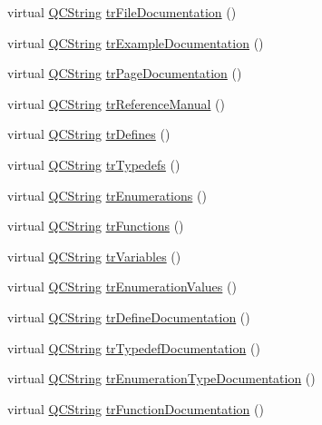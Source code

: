 \begin{DoxyCompactItemize}
virtual \hyperlink{class_q_c_string}{Q\-C\-String} \hyperlink{class_translator_slovak_a5208d68e101288c987a9c3460f4708f8}{tr\-File\-Documentation} ()
\item 
virtual \hyperlink{class_q_c_string}{Q\-C\-String} \hyperlink{class_translator_slovak_a21a3f1a3c620fec9b4f7f8ecc21fff8e}{tr\-Example\-Documentation} ()
\item 
virtual \hyperlink{class_q_c_string}{Q\-C\-String} \hyperlink{class_translator_slovak_a7cf8ab505f757f138ca06e41097d7e8d}{tr\-Page\-Documentation} ()
\item 
virtual \hyperlink{class_q_c_string}{Q\-C\-String} \hyperlink{class_translator_slovak_a2c056f492d9d9bfc42e365c9a72f690f}{tr\-Reference\-Manual} ()
\item 
virtual \hyperlink{class_q_c_string}{Q\-C\-String} \hyperlink{class_translator_slovak_aa64bcd419328b32bfc89195cf544cbbc}{tr\-Defines} ()
\item 
virtual \hyperlink{class_q_c_string}{Q\-C\-String} \hyperlink{class_translator_slovak_ac46d406eb9bb5b176aae39b6c502d8ed}{tr\-Typedefs} ()
\item 
virtual \hyperlink{class_q_c_string}{Q\-C\-String} \hyperlink{class_translator_slovak_a4ee6ca6fa76e56b5404130aaaf698085}{tr\-Enumerations} ()
\item 
virtual \hyperlink{class_q_c_string}{Q\-C\-String} \hyperlink{class_translator_slovak_a167145cf16c86e425b98e2cedaeb30b8}{tr\-Functions} ()
\item 
virtual \hyperlink{class_q_c_string}{Q\-C\-String} \hyperlink{class_translator_slovak_ab9d317c84bc4abb3da70fa921e542d55}{tr\-Variables} ()
\item 
virtual \hyperlink{class_q_c_string}{Q\-C\-String} \hyperlink{class_translator_slovak_a5b53beb7849e7952f7887b398b5adf9d}{tr\-Enumeration\-Values} ()
\item 
virtual \hyperlink{class_q_c_string}{Q\-C\-String} \hyperlink{class_translator_slovak_a1c23aba98edb190847a7d510a4ed24fc}{tr\-Define\-Documentation} ()
\item 
virtual \hyperlink{class_q_c_string}{Q\-C\-String} \hyperlink{class_translator_slovak_a284d8febafa52e730c3f929a1f17f166}{tr\-Typedef\-Documentation} ()
\item 
virtual \hyperlink{class_q_c_string}{Q\-C\-String} \hyperlink{class_translator_slovak_a03114d3cc3330b921600693ad71adc2f}{tr\-Enumeration\-Type\-Documentation} ()
\item 
virtual \hyperlink{class_q_c_string}{Q\-C\-String} \hyperlink{class_translator_slovak_a8dc8036d97f4f5406392646044d5af7e}{tr\-Function\-Documentation} ()

\end{DoxyCompactItemize}
